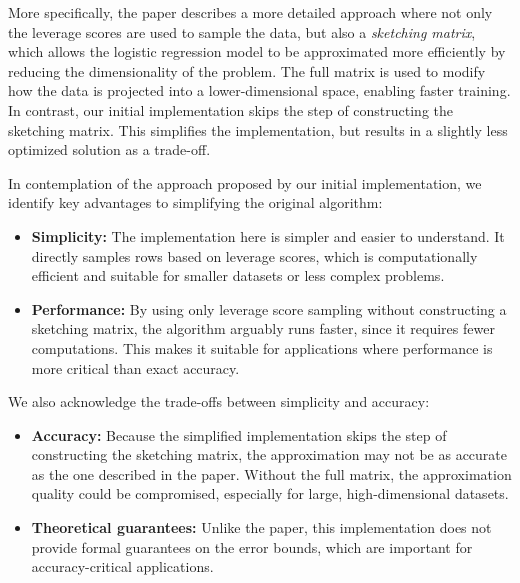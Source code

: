 \documentclass{article}
\theoremstyle{plain}
\theoremstyle{definition}
\theoremstyle{remark}
\begin{document}
More specifically, the paper describes a more detailed approach where not only the leverage scores are used to sample the data, but also a \textit{sketching matrix}, which allows the logistic regression model to be approximated more efficiently by reducing the dimensionality of the problem. The full matrix is used to modify how the data is projected into a lower-dimensional space, enabling faster training. In contrast, our initial implementation skips the step of constructing the sketching matrix. This simplifies the implementation, but results in a slightly less optimized solution as a trade-off.

In contemplation of the approach proposed by our initial implementation, we identify key advantages to simplifying the original algorithm:

\begin{itemize}

\item \textbf{Simplicity:} The implementation here is simpler and easier to understand. It directly samples rows based on leverage scores, which is computationally efficient and suitable for smaller datasets or less complex problems.

\item \textbf{Performance:} By using only leverage score sampling without constructing a sketching matrix, the algorithm arguably runs faster, since it requires fewer computations. This makes it suitable for applications where performance is more critical than exact accuracy.

\end{itemize}

We also acknowledge the trade-offs between simplicity and accuracy:

\begin{itemize}

\item \textbf{Accuracy:} Because the simplified implementation skips the step of constructing the sketching matrix, the approximation may not be as accurate as the one described in the paper. Without the full matrix, the approximation quality could be compromised, especially for large, high-dimensional datasets.

\item \textbf{Theoretical guarantees:} Unlike the paper, this implementation does not provide formal guarantees on the error bounds, which are important for accuracy-critical applications.

\end{itemize}
\end{document}
